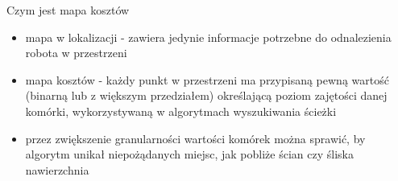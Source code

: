 
\begin{frame}{Czym jest mapa kosztów}
	\begin{itemize}
		\item mapa w lokalizacji - zawiera jedynie informacje potrzebne do odnalezienia robota w przestrzeni
		\item mapa kosztów - każdy punkt w przestrzeni ma przypisaną pewną wartość (binarną lub z większym przedziałem) określającą poziom zajętości danej komórki, wykorzystywaną w algorytmach wyszukiwania ścieżki
		\item przez zwiększenie granularności wartości komórek można sprawić, by algorytm unikał niepożądanych miejsc, jak pobliże ścian czy śliska nawierzchnia
	\end{itemize}
\end{frame}


